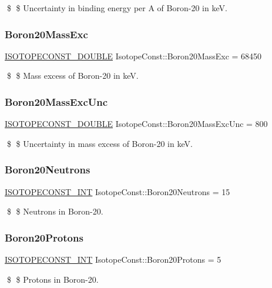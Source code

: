\$ \$ Uncertainty in binding energy per A of Boron-\/20 in keV. \mbox{\label{group___isotope_const-_boron-_b20_ga409ae9a451bc8ff76166b500d7c04225}} 
\subsubsection{\texorpdfstring{Boron20\+Mass\+Exc}{Boron20MassExc}}
{\footnotesize\ttfamily \mbox{\hyperlink{group___isotope_const-_macros_ga8f45a7272ce02c0b4c65c44636ed719a}{I\+S\+O\+T\+O\+P\+E\+C\+O\+N\+S\+T\+\_\+\+D\+O\+U\+B\+LE}} Isotope\+Const\+::\+Boron20\+Mass\+Exc = 68450}

\$ \$ Mass excess of Boron-\/20 in keV. \mbox{\label{group___isotope_const-_boron-_b20_ga9eb1c4850e6159d4b5ef007254b84eb3}} 
\subsubsection{\texorpdfstring{Boron20\+Mass\+Exc\+Unc}{Boron20MassExcUnc}}
{\footnotesize\ttfamily \mbox{\hyperlink{group___isotope_const-_macros_ga8f45a7272ce02c0b4c65c44636ed719a}{I\+S\+O\+T\+O\+P\+E\+C\+O\+N\+S\+T\+\_\+\+D\+O\+U\+B\+LE}} Isotope\+Const\+::\+Boron20\+Mass\+Exc\+Unc = 800}

\$ \$ Uncertainty in mass excess of Boron-\/20 in keV. \mbox{\label{group___isotope_const-_boron-_b20_ga3e6c7dea11b03b759ea4678d37fe4a37}} 
\subsubsection{\texorpdfstring{Boron20\+Neutrons}{Boron20Neutrons}}
{\footnotesize\ttfamily \mbox{\hyperlink{group___isotope_const-_macros_ga5f18360b3e99483a35c32d789e62621c}{I\+S\+O\+T\+O\+P\+E\+C\+O\+N\+S\+T\+\_\+\+I\+NT}} Isotope\+Const\+::\+Boron20\+Neutrons = 15}

\$ \$ Neutrons in Boron-\/20. \mbox{\label{group___isotope_const-_boron-_b20_ga15afca8da55efb47a8998132edd99fd9}} 
\subsubsection{\texorpdfstring{Boron20\+Protons}{Boron20Protons}}
{\footnotesize\ttfamily \mbox{\hyperlink{group___isotope_const-_macros_ga5f18360b3e99483a35c32d789e62621c}{I\+S\+O\+T\+O\+P\+E\+C\+O\+N\+S\+T\+\_\+\+I\+NT}} Isotope\+Const\+::\+Boron20\+Protons = 5}

\$ \$ Protons in Boron-\/20. 